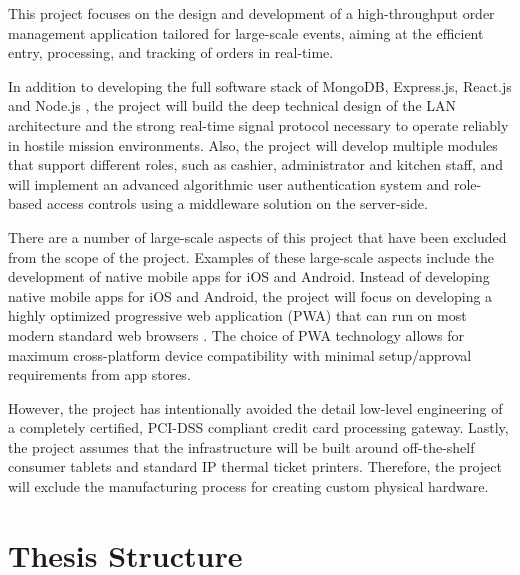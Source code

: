 This project focuses on the design and development of a high-throughput order management application tailored for large-scale events, aiming at the efficient entry, processing, and tracking of orders in real-time.

In addition to developing the full software stack of MongoDB, Express.js, React.js and Node.js \cite{banker2011mongodb, express, freeman2019pro, tilkov2010node}, the project will build the deep technical design of the LAN architecture and the strong real-time signal protocol necessary to operate reliably in hostile mission environments. Also, the project will develop multiple modules that support different roles, such as cashier, administrator and kitchen staff, and will implement an advanced algorithmic user authentication system and role-based access controls using a middleware solution on the server-side.

There are a number of large-scale aspects of this project that have been excluded from the scope of the project. Examples of these large-scale aspects include the development of native mobile apps for iOS and Android. Instead of developing native mobile apps for iOS and Android, the project will focus on developing a highly optimized progressive web application (PWA) that can run on most modern standard web browsers \cite{google2020offline}. The choice of PWA technology allows for maximum cross-platform device compatibility with minimal setup/approval requirements from app stores.

However, the project has intentionally avoided the detail low-level engineering of a completely certified, PCI-DSS compliant credit card processing gateway. Lastly, the project assumes that the infrastructure will be built around off-the-shelf consumer tablets and standard IP thermal ticket printers. Therefore, the project will exclude the manufacturing process for creating custom physical hardware.

\section{Thesis Structure}

